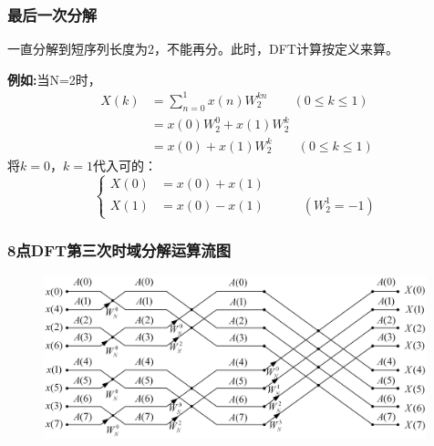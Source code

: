 \documentclass[notheorems,compress,mathserif,table]{beamer}
\begin{document}
\begin{frame}[shrink]\frametitle{最后一次分解}
一直分解到短序列长度为2，不能再分。此时，DFT计算按定义来算。
\par \textbf{例如:}当N=2时，
\begin{equation*}
\begin{split}
X(k)&= \sum_{n=0}^{1}x(n)W_{2}^{kn} \quad\quad(0\leq k\leq1)\\
    &=x(0)W_{2}^{0} + x(1)W_{2}^{k}\\
    &=x(0) + x(1)W_{2}^{k}\quad\quad(0\leq k\leq1)
\end{split}
\end{equation*}
将$k=0$，$k=1$代入可的：
\begin{equation*} \label{eq:2}
\left\{ \begin{aligned}
  X(0) &= x(0) +x(1)\\
  X(1) &= x(0) -x(1) \quad\quad\quad( W_2^1=-1)
\end{aligned} \right.
\end{equation*}
\end{frame}
\begin{frame}[shrink]\frametitle{8点DFT第三次时域分解运算流图}
\begin{figure}[h]
  \centering
  \includegraphics[width=0.99\textwidth]{8dftThird.jpg}
\end{figure}
\end{frame}
\end{document}
